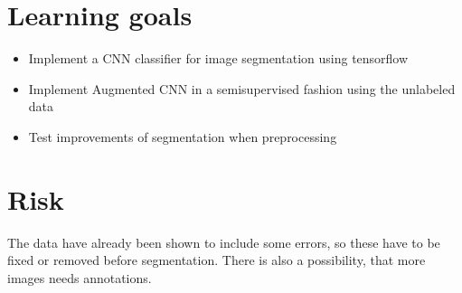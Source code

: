 \documentclass{article}
\begin{document}
\section*{Learning goals}
\begin{itemize}
    \item Implement a CNN classifier for image segmentation using tensorflow
    \item Implement Augmented CNN in a semisupervised fashion using the unlabeled data
    \item Test improvements of segmentation when preprocessing
\end{itemize}

\section*{Risk} %
\label{sec:risk}
The data have already been shown to include some errors, so these have to be
fixed or removed before segmentation.
There is also a possibility, that more images needs annotations.
\end{document}
